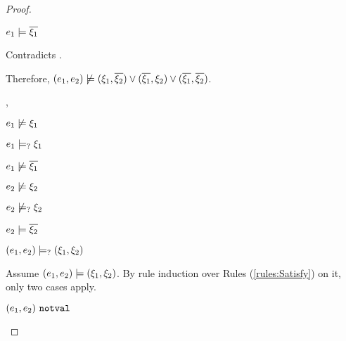 \begin{proof}
\begin{byCases}
\begin{byCases}
\begin{byCases}
\begin{byCases}
\begin{byCases}
\begin{byCases}
                        \begin{pfsteps*}
                        \item $e_1 \models \overline{\xi_1}$ 
                        \end{pfsteps*}
                        Contradicts .
                    \end{byCases}
                \end{byCases}
            \end{byCases}
            Therefore, $(e_1 , e_2) \not\models (\xi_1 , \overline{\xi_2}) \vee (\overline{\xi_1} , \xi_2) \vee (\overline{\xi_1} , \overline{\xi_2})$.
            
        \item[\cmaysatisfy{e_1}{\xi_1},\csatisfy{e_2}{\cdual{\xi_2}}]
            \begin{pfsteps*}
            \item $e_1 \not\models \xi_1$  
            \item $e_1 \models_{?} \xi_1$  
            \item $e_1 \not\models \overline{\xi_1}$  
            \item $e_2 \not\models \xi_2$  
            \item $e_2 \not\models_{?} \xi_2$  
            \item $e_2 \models \overline{\xi_2}$  
            \item $(e_1 , e_2) \models_{?} (\xi_1 , \xi_2)$ 
            \end{pfsteps*}
            Assume $(e_1 , e_2) \models (\xi_1 , \xi_2)$. By rule induction over Rules (\ref{rules:Satisfy}) on it, only two cases apply. 
           \begin{byCases}
            \item[\text{(\ref{rule:CSNotValPair})}]
                \begin{pfsteps*}
                \item $(e_1 , e_2) ~\mathtt{notval}$ 
                \end{pfsteps*}

\end{byCases}
\end{byCases}
\end{byCases}
\end{byCases}
\end{proof}
